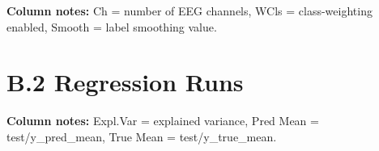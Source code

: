 \noindent\textbf{Column notes:} Ch = number of EEG channels, WCls = class-weighting enabled, Smooth = label smoothing value.

\section*{B.2 Regression Runs}
\begin{table}[H]
\centering
\scriptsize
{}
\caption{Detailed regression run comparison.}
\label{tab:appendix-regression-runs}
\end{table}

\noindent\textbf{Column notes:} Expl.Var = explained variance, Pred Mean = test/y\_pred\_mean, True Mean = test/y\_true\_mean.